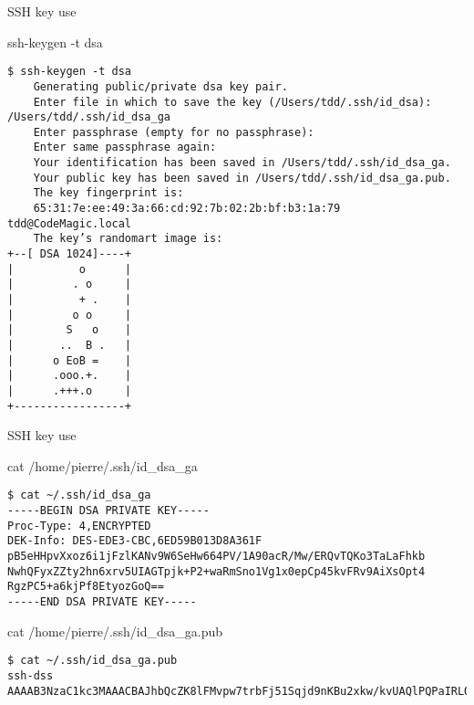 \begin{frame}[fragile]{SSH key use}
\begin{block}{}
ssh-keygen -t dsa
\end{block}
\pause
\begin{verbatim}
$ ssh-keygen -t dsa
	Generating public/private dsa key pair.
	Enter file in which to save the key (/Users/tdd/.ssh/id_dsa): /Users/tdd/.ssh/id_dsa_ga
	Enter passphrase (empty for no passphrase):
	Enter same passphrase again:
	Your identification has been saved in /Users/tdd/.ssh/id_dsa_ga.
	Your public key has been saved in /Users/tdd/.ssh/id_dsa_ga.pub.
	The key fingerprint is:
	65:31:7e:ee:49:3a:66:cd:92:7b:02:2b:bf:b3:1a:79 tdd@CodeMagic.local
	The key’s randomart image is:
+--[ DSA 1024]----+
|          o      |
|         . o     |
|          + .    |
|         o o     |
|        S   o    |
|       ..  B .   |
|      o EoB =    |
|      .ooo.+.    |
|      .+++.o     |
+-----------------+
\end{verbatim}
\end{frame}

\begin{frame}[fragile]{SSH key use}
\begin{block}{}
cat /home/pierre/.ssh/id{\_}dsa{\_}ga
\end{block}
\pause
\begin{verbatim}
$ cat ~/.ssh/id_dsa_ga
-----BEGIN DSA PRIVATE KEY-----
Proc-Type: 4,ENCRYPTED
DEK-Info: DES-EDE3-CBC,6ED59B013D8A361F
pB5eHHpvXxoz6i1jFzlKANv9W6SeHw664PV/1A90acR/Mw/ERQvTQKo3TaLaFhkb
NwhQFyxZZty2hn6xrv5UIAGTpjk+P2+waRmSno1Vg1x0epCp45kvFRv9AiXsOpt4
RgzPC5+a6kjPf8EtyozGoQ==
-----END DSA PRIVATE KEY-----
\end{verbatim}
\begin{block}{}
cat /home/pierre/.ssh/id{\_}dsa{\_}ga.pub
\end{block}
\begin{verbatim}
$ cat ~/.ssh/id_dsa_ga.pub
ssh-dss AAAAB3NzaC1kc3MAAACBAJhbQcZK8lFMvpw7trbFj51Sqjd9nKBu2xkw/kvUAQlPQPaIRLOiq92fxp+
\end{verbatim}
\end{frame}

